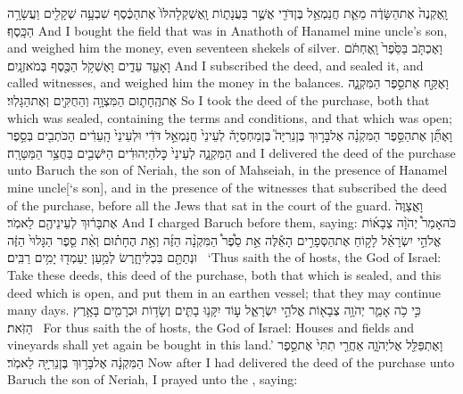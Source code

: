 {וָֽאֶקְנֶה֙ אֶת\maqqaf הַשָּׂדֶ֔ה מֵאֵ֛ת חֲנַמְאֵ֥ל בֶּן\maqqaf דֹּדִ֖י אֲשֶׁ֣ר בַּעֲנָת֑וֹת וָֽאֶשְׁקְלָה\maqqaf לּוֹ֙ אֶת\maqqaf הַכֶּ֔סֶף שִׁבְעָ֥ה שְׁקָלִ֖ים וַעֲשָׂרָ֥ה הַכָּֽסֶף׃}
{And I bought the field that was in Anathoth of Hanamel mine uncle’s son, and weighed him the money, even seventeen shekels of silver.}
{וָאֶכְתֹּ֤ב בַּסֵּ֙פֶר֙ וָֽאֶחְתֹּ֔ם וָאָעֵ֖ד עֵדִ֑ים וָאֶשְׁקֹ֥ל הַכֶּ֖סֶף בְּמֹאזְנָֽיִם׃}
{And I subscribed the deed, and sealed it, and called witnesses, and weighed him the money in the balances.}
{וָאֶקַּ֖ח אֶת\maqqaf סֵ֣פֶר הַמִּקְנָ֑ה אֶת\maqqaf הֶֽחָת֛וּם הַמִּצְוָ֥ה וְהַחֻקִּ֖ים וְאֶת\maqqaf הַגָּלֽוּי׃}
{So I took the deed of the purchase, both that which was sealed, containing the terms and conditions, and that which was open;}
{וָאֶתֵּ֞ן אֶת\maqqaf הַסֵּ֣פֶר הַמִּקְנָ֗ה אֶל\maqqaf בָּר֣וּךְ בֶּן\maqqaf נֵרִיָּה֮ בֶּן\maqqaf מַחְסֵיָה֒ לְעֵינֵי֙ חֲנַמְאֵ֣ל דֹּדִ֔י וּלְעֵינֵי֙ הָֽעֵדִ֔ים הַכֹּתְבִ֖ים בְּסֵ֣פֶר הַמִּקְנָ֑ה לְעֵינֵי֙ כׇּל\maqqaf הַיְּהוּדִ֔ים הַיֹּשְׁבִ֖ים בַּחֲצַ֥ר הַמַּטָּרָֽה׃}
{and I delivered the deed of the purchase unto Baruch the son of Neriah, the son of Mahseiah, in the presence of Hanamel mine uncle[‘s son], and in the presence of the witnesses that subscribed the deed of the purchase, before all the Jews that sat in the court of the guard.}
{וָאֲצַוֶּה֙ אֶת\maqqaf בָּר֔וּךְ לְעֵינֵיהֶ֖ם לֵאמֹֽר׃}
{And I charged Baruch before them, saying:}
{כֹּה\maqqaf אָמַר֩ יְהֹוָ֨ה צְבָא֜וֹת אֱלֹהֵ֣י יִשְׂרָאֵ֗ל לָק֣וֹחַ אֶת\maqqaf הַסְּפָרִ֣ים הָאֵ֡לֶּה אֵ֣ת סֵ֩פֶר֩ הַמִּקְנָ֨ה הַזֶּ֜ה וְאֵ֣ת הֶחָת֗וּם וְאֵ֨ת סֵ֤פֶר הַגָּלוּי֙ הַזֶּ֔ה וּנְתַתָּ֖ם בִּכְלִי\maqqaf חָ֑רֶשׂ לְמַ֥עַן יַעַמְד֖וּ יָמִ֥ים רַבִּֽים׃ \setuma }
{‘Thus saith the \lord\space of hosts, the God of Israel: Take these deeds, this deed of the purchase, both that which is sealed, and this deed which is open, and put them in an earthen vessel; that they may continue many days.}
{כִּ֣י כֹ֥ה אָמַ֛ר יְהֹוָ֥ה צְבָא֖וֹת אֱלֹהֵ֣י יִשְׂרָאֵ֑ל ע֣וֹד יִקָּנ֥וּ בָתִּ֛ים וְשָׂד֥וֹת וּכְרָמִ֖ים בָּאָ֥רֶץ הַזֹּֽאת׃ \petucha }
{For thus saith the \lord\space of hosts, the God of Israel: Houses and fields and vineyards shall yet again be bought in this land.’}
{וָאֶתְפַּלֵּ֖ל אֶל\maqqaf יְהֹוָ֑ה אַחֲרֵ֤י תִתִּי֙ אֶת\maqqaf סֵ֣פֶר הַמִּקְנָ֔ה אֶל\maqqaf בָּר֥וּךְ בֶּן\maqqaf נֵרִיָּ֖ה לֵאמֹֽר׃}
{Now after I had delivered the deed of the purchase unto Baruch the son of Neriah, I prayed unto the \lord, saying:}
